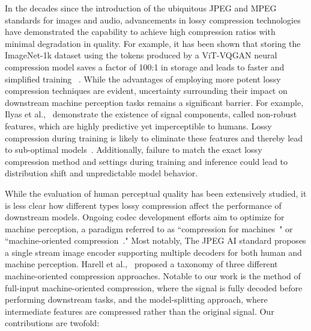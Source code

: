 \documentclass[10pt,twocolumn,letterpaper]{article}
\begin{document}
In the decades since the introduction of the ubiquitous JPEG and MPEG standards for images and audio, advancements in lossy compression technologies have demonstrated the capability to achieve high compression ratios with minimal degradation in quality. For example, it has been shown that storing the ImageNet-1k dataset using the tokens produced by a ViT-VQGAN neural compression model saves a factor of 100:1 in storage and leads to faster and simplified training ~\cite{yu2021vector}\cite{park2023storage}. 
While the advantages of employing more potent lossy compression techniques are evident, uncertainty surrounding their impact on downstream machine perception tasks remains a significant barrier. For example, Ilyas et al.,~\cite{ilyas2019adversarial} demonstrate the existence of signal components, called non-robust features, which are highly predictive yet imperceptible to humans. Lossy compression during training is likely to eliminate these features and thereby lead to sub-optimal models~\cite{aydemir2018effects}. Additionally, failure to match the exact lossy compression method and settings during training and inference could lead to distribution shift and unpredictable model behavior.

While the evaluation of human perceptual quality has been extensively studied, it is less clear how different types lossy compression affect the performance of downstream models. Ongoing codec development efforts aim to optimize for machine perception, a paradigm referred to as ``compression for machines~\cite{chamain2021end}" or ``machine-oriented compression~\cite{kang2023super}."  Most notably, The JPEG AI standard \cite{ascenso2023jpeg} proposes a single stream image encoder supporting multiple decoders for both human and machine perception. Harell et al.,~\cite{harell2023rate} proposed a taxonomy of three different machine-oriented compression approaches. Notable to our work is the method of full-input machine-oriented compression, where the signal is fully decoded before performing downstream tasks, and the model-splitting approach, where intermediate features are compressed rather than the original signal. Our contributions are twofold:
\end{document}

